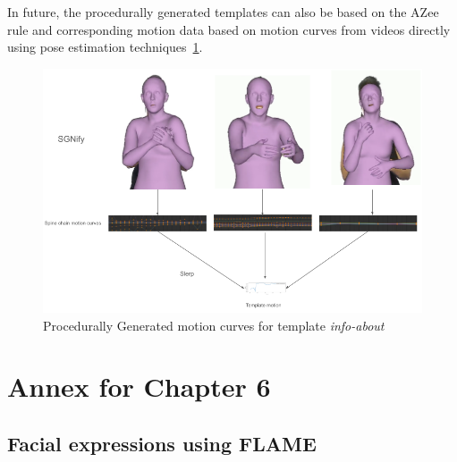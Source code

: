 \documentclass[../main.tex]{subfiles}
\begin{document}
In future, the procedurally generated templates can also be based on the AZee rule and corresponding motion data based on motion curves from videos directly using pose estimation techniques~\ref{fig:motion_curves_template_procedural_pose_est}.

\begin{figure}
    \centering \includegraphics[width = 5in]{chapters/intermediate_blocks_pose_correction/images/motion_curves_template_procedural_pose_est.png}
    \caption{Procedurally Generated motion curves for template \emph{info-about}}
    \label{fig:motion_curves_template_procedural_pose_est}
\end{figure}

\section{Annex for Chapter 6}
\label{app:facial_expressions}

\subsection{Facial expressions using FLAME}
\label{app:facial_expressions:flame}
\end{document}

